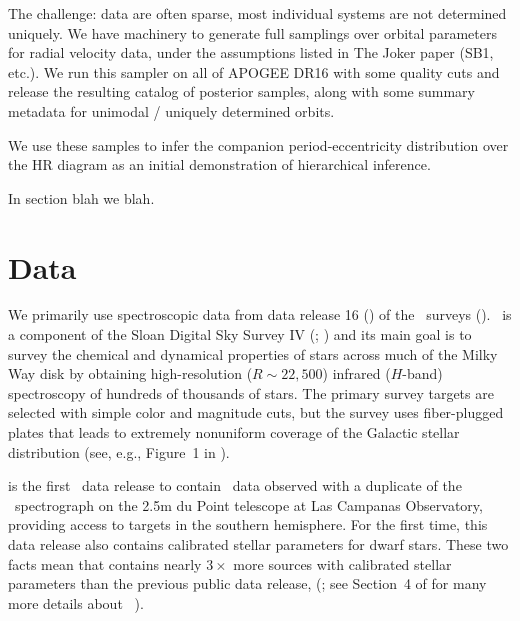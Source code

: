 \documentclass[modern]{aastex63}
\begin{document}
The challenge: data are often sparse, most individual systems are not determined
uniquely.
We have machinery to generate full samplings over orbital parameters for radial
velocity data, under the assumptions listed in The Joker paper (SB1, etc.).
We run this sampler on all of APOGEE DR16 with some quality cuts and release the
resulting catalog of posterior samples, along with some summary metadata for
unimodal / uniquely determined orbits.

We use these samples to infer the companion period-eccentricity distribution
over the HR diagram as an initial demonstration of hierarchical inference.

In section blah we blah.

\section{Data} \label{sec:data}

We primarily use spectroscopic data from data release 16 () of the
\apogee\ surveys (\citealt{Majewski:2017, DR16}).
\apogee\ is a component of the Sloan Digital Sky Survey IV (\sdssiv;
\citealt{Gunn:2006, Blanton:2017}) and its main goal is to survey the chemical
and dynamical properties of stars across much of the Milky Way disk by obtaining
high-resolution ($R \sim 22,500$) infrared ($H$-band) spectroscopy of hundreds
of thousands of stars.
The primary survey targets are selected with simple color and magnitude cuts,
but the survey uses fiber-plugged plates that leads to extremely nonuniform
coverage of the Galactic stellar distribution (see, e.g., Figure~1 in
\citealt{DR16}).

 is the first \sdss\ data release to contain \apogee\ data observed with
a duplicate of the \apogee\ spectrograph on the 2.5m du Point telescope at Las
Campanas Observatory, providing access to targets in the southern hemisphere.
For the first time, this data release also contains calibrated stellar
parameters for dwarf stars.
These two facts mean that  contains nearly $3\times$ more sources with
calibrated stellar parameters than the previous public data release, 
(\citealt{Abolfathi:2017}; see Section~4 of \citealt{DR16} for many more details
about \apogee\ ).
\end{document}

